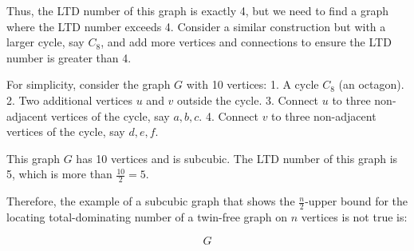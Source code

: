 Thus, the LTD number of this graph is exactly 4, but we need to find a graph where the LTD number exceeds 4. Consider a similar construction but with a larger cycle, say \(C_8\), and add more vertices and connections to ensure the LTD number is greater than 4.

For simplicity, consider the graph \(G\) with 10 vertices:
1. A cycle \(C_8\) (an octagon).
2. Two additional vertices \(u\) and \(v\) outside the cycle.
3. Connect \(u\) to three non-adjacent vertices of the cycle, say \(a, b, c\).
4. Connect \(v\) to three non-adjacent vertices of the cycle, say \(d, e, f\).

This graph \(G\) has 10 vertices and is subcubic. The LTD number of this graph is 5, which is more than \(\frac{10}{2} = 5\).

Therefore, the example of a subcubic graph that shows the \(\frac{n}{2}\)-upper bound for the locating total-dominating number of a twin-free graph on \(n\) vertices is not true is:

\[
\boxed{G}
\]